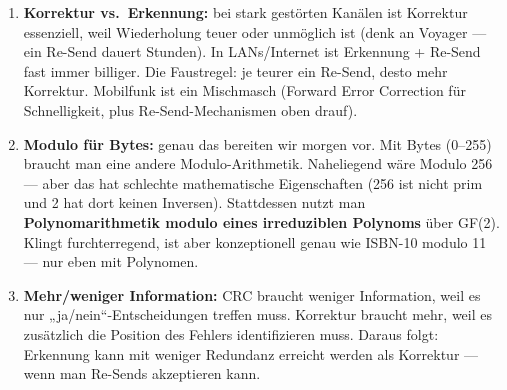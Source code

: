 \begin{enumerate}
\item \textbf{Korrektur vs.\ Erkennung:} bei stark gestörten Kanälen
  ist Korrektur essenziell, weil Wiederholung teuer oder unmöglich ist
  (denk an Voyager — ein Re-Send dauert Stunden). In LANs/Internet
  ist Erkennung + Re-Send fast immer billiger. Die Faustregel: je
  teurer ein Re-Send, desto mehr Korrektur. Mobilfunk ist ein
  Mischmasch (Forward Error Correction für Schnelligkeit, plus
  Re-Send-Mechanismen oben drauf).

\item \textbf{Modulo für Bytes:} genau das bereiten wir morgen vor.
  Mit Bytes (0–255) braucht man eine andere Modulo-Arithmetik.
  Naheliegend wäre Modulo 256 — aber das hat schlechte mathematische
  Eigenschaften (256 ist nicht prim und 2 hat dort keinen Inversen).
  Stattdessen nutzt man \textbf{Polynomarithmetik modulo eines
  irreduziblen Polynoms} über GF(2). Klingt furchterregend, ist aber
  konzeptionell genau wie ISBN-10 modulo 11 — nur eben mit Polynomen.

\item \textbf{Mehr/weniger Information:} CRC braucht weniger
  Information, weil es nur „ja/nein“-Entscheidungen treffen muss.
  Korrektur braucht mehr, weil es zusätzlich die Position des Fehlers
  identifizieren muss. Daraus folgt: Erkennung kann mit weniger
  Redundanz erreicht werden als Korrektur — wenn man Re-Sends
  akzeptieren kann.
\end{enumerate}
